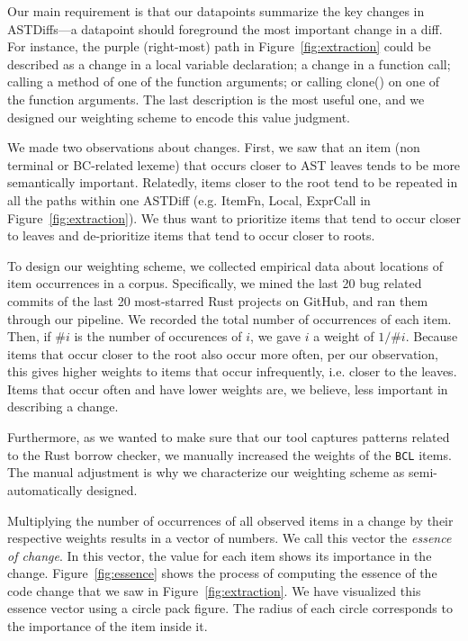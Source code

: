 Our main requirement is that our datapoints summarize the key changes in ASTDiffs---a datapoint should foreground the most important change in a diff. For instance, the purple (right-most) path in Figure~\ref{fig:extraction} could be described as a change in a local variable declaration; a change in a function call; calling a method of one of the function arguments; or calling clone() on one of the function arguments. The last description is the most useful one, and we designed our weighting scheme to encode this value judgment.

We made two observations about changes. First, we saw that an item (non terminal or BC-related lexeme) that occurs closer to AST leaves tends to be more semantically important. Relatedly, items closer to the root tend to be repeated in all the paths within one ASTDiff (e.g. ItemFn, Local, ExprCall in Figure~\ref{fig:extraction}). We thus want to prioritize items that tend to occur closer to leaves and de-prioritize items that tend to occur closer to roots.

To design our weighting scheme, we collected empirical data about locations of item occurrences in a corpus. Specifically, we mined the last 20 bug related commits of the last 20 most-starred Rust projects on GitHub, and ran them through our pipeline. We recorded the total number of occurrences of each item. Then, if $\# i$ is the number of occurences of $i$, we gave $i$ a weight of $1/\# i$. Because items that occur closer to the root also occur more often, per our observation, this gives higher weights to items that occur infrequently, i.e. closer to the leaves. Items that occur often and have lower weights are, we believe, less important in describing a change.

Furthermore, as we wanted to make sure that our tool captures patterns related to the Rust borrow checker, we manually increased the weights of the \texttt{BCL} items. The manual adjustment is why we characterize our weighting scheme as semi-automatically designed. 

Multiplying the number of occurrences of all observed items in a change by their respective weights results in a vector of numbers. We call this vector the \emph{essence of change}. In this vector, the value for each item shows its importance in the change. Figure~\ref{fig:essence} shows the process of computing the essence of the code change that we saw in Figure~\ref{fig:extraction}. We have visualized this essence vector using a circle pack figure. The radius of each circle corresponds to the importance of the item inside it.

